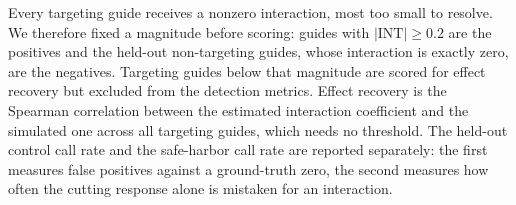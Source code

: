 Every targeting guide receives a nonzero interaction, most too small to
resolve.  We therefore fixed a magnitude before scoring: guides with
$\lvert\mathrm{INT}\rvert\geq0.2$ are the positives and the held-out
non-targeting guides, whose interaction is exactly zero, are the negatives.
Targeting guides below that magnitude are scored for effect recovery but
excluded from the detection metrics.  Effect recovery is the Spearman
correlation between the estimated interaction coefficient and the simulated
one across all targeting guides, which needs no threshold.  The held-out
control call rate and the safe-harbor call rate are reported separately: the
first measures false positives against a ground-truth zero, the second
measures how often the cutting response alone is mistaken for an interaction.
